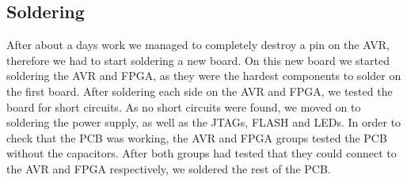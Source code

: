 \subsection{Soldering}
After about a days work we managed to completely destroy a pin on the AVR,
therefore we had to start soldering a new board. On this new board we
started soldering the AVR and \ac{FPGA}, as they were the hardest components to
solder on the first board. After soldering each side on the AVR and \ac{FPGA}, 
we tested the board for short circuits. As no short circuits were found, 
we moved on to soldering the power supply, as well as the \acp{JTAG}, FLASH 
and \acp{LED}. In order to check that the \ac{PCB} was working, the
AVR and \ac{FPGA} groups tested the \ac{PCB} without the capacitors. 
After both groups had tested that they could connect to the AVR and \ac{FPGA}
respectively, we soldered the rest of the \ac{PCB}.
